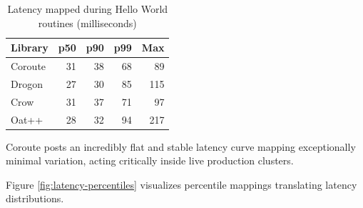 \begin{table}[H]
\centering
\caption{Latency mapped during Hello World routines (milliseconds)}
\label{tab:latency}
\begin{tabular}{|l|r|r|r|r|}
\hline
\textbf{Library} & \textbf{p50} & \textbf{p90} & \textbf{p99} & \textbf{Max} \\
\hline
Coroute & 31 & 38 & 68 & 89 \\
Drogon & 27 & 30 & 85 & 115 \\
Crow & 31 & 37 & 71 & 97 \\
Oat++ & 28 & 32 & 94 & 217 \\
\hline
\end{tabular}
\end{table}

Coroute posts an incredibly flat and stable latency curve mapping exceptionally minimal variation, acting critically inside live production clusters.

Figure \ref{fig:latency-percentiles} visualizes percentile mappings translating latency distributions.

